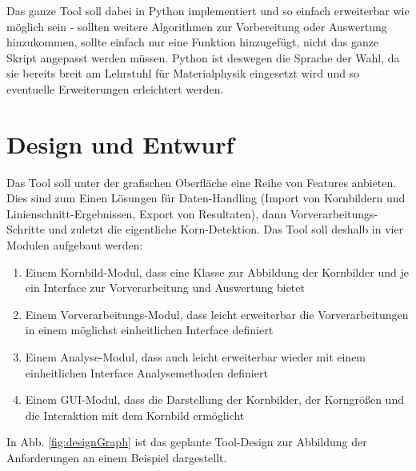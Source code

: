 \documentclass[
  12pt,
]{book}
\providecommand{\tightlist}{%
  \setlength{\itemsep}{0pt}\setlength{\parskip}{0pt}}
\begin{document}
Das ganze Tool soll dabei in Python implementiert und so einfach erweiterbar wie möglich sein - sollten weitere Algorithmen zur Vorbereitung oder Auswertung hinzukommen, sollte einfach nur eine Funktion hinzugefügt, nicht das ganze Skript angepasst werden müssen. Python ist deswegen die Sprache der Wahl, da sie bereits breit am Lehrstuhl für Materialphysik eingesetzt wird und so eventuelle Erweiterungen erleichtert werden.

\hypertarget{design-und-entwurf}{%
\chapter{Design und Entwurf}\label{design-und-entwurf}}

Das Tool soll unter der grafischen Oberfläche eine Reihe von Features anbieten. Dies sind zum Einen Lösungen für Daten-Handling (Import von Kornbildern und Linienschnitt-Ergebnissen, Export von Resultaten), dann Vorverarbeitungs-Schritte und zuletzt die eigentliche Korn-Detektion. Das Tool soll deshalb in vier Modulen aufgebaut werden:

\begin{enumerate}
\def\labelenumi{\arabic{enumi}.}
\tightlist
\item
  Einem Kornbild-Modul, dass eine Klasse zur Abbildung der Kornbilder und je ein Interface zur Vorverarbeitung und Auswertung bietet
\item
  Einem Vorverarbeitungs-Modul, dass leicht erweiterbar die Vorverarbeitungen in einem möglichst einheitlichen Interface definiert
\item
  Einem Analyse-Modul, dass auch leicht erweiterbar wieder mit einem einheitlichen Interface Analysemethoden definiert
\item
  Einem GUI-Modul, dass die Darstellung der Kornbilder, der Korngrößen und die Interaktion mit dem Kornbild ermöglicht
\end{enumerate}

In Abb. \ref{fig:designGraph} ist das geplante Tool-Design zur Abbildung der Anforderungen an einem Beispiel dargestellt.
\end{document}
